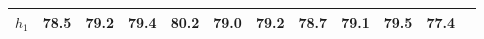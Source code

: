 
        \begin{tabular}{c|*{11}{c}}
            \hline
            \hline
                \(h_{1}\) &78.5 & 79.2& 79.4 & 80.2 & 79.0& 79.2 & 78.7 & 79.1 & 79.5 & 77.4\\
            \hline
            \hline
        \end{tabular}
        